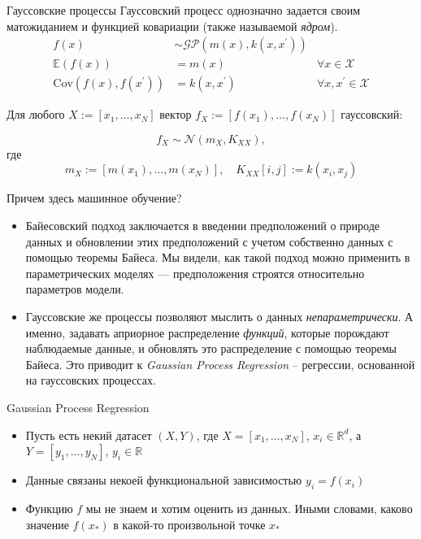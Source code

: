 \documentclass[fullscreen=true, bookmarks=true, hyperref={pdfencoding=unicode}]{beamer}
\begin{document}
\begin{frame}{Гауссовские процессы}
    Гауссовский процесс однозначно задается своим матожиданием и функцией ковариации (также называемой \textit{ядром}).
    \begin{align*} f(x) &\sim \mathcal{GP} (m(x), k(x, x^\prime)) \\
     \mathbb{E}(f(x)) &= m(x) \quad &\forall x \in \mathcal{X} \\
     \text{Cov} ( f(x), f(x^\prime) ) &= k(x, x^\prime) \quad &\forall x, x^\prime \in \mathcal{X} \end{align*}

    \pause
    Для любого $X := [x_1, \ldots, x_N]$ вектор $f_X := [f(x_1), \ldots, f(x_N)]$ гауссовский:

    $$ f_X \sim \mathcal{N}(m_X, K_{XX}), $$
    где
    $$m_X := [m(x_1), \ldots, m(x_N)], \quad K_{XX}[i, j] := k(x_i, x_j)$$
\end{frame}

\begin{frame}{Причем здесь машинное обучение?}
    \begin{itemize}
        \item<1-> Байесовский подход заключается в введении предположений о природе данных и обновлении этих предположений с учетом собственно данных с помощью теоремы Байеса. Мы видели, как такой подход можно применить в параметрических моделях --- предположения строятся относительно параметров модели.

        \item<2-> Гауссовские же процессы позволяют мыслить о данных \textit{непараметрически}. А именно, задавать априорное распределение \textit{функций}, которые порождают наблюдаемые данные, и обновлять это распределение с помощью теоремы Байеса. Это приводит к \textit{Gaussian Process Regression} -- регрессии, основанной на гауссовских процессах.
    \end{itemize}

\end{frame}

\begin{frame}{Gaussian Process Regression}
    \begin{itemize}
      \item Пусть есть некий датасет $(X, Y)$, где $X = [x_1, \ldots, x_N]$, $x_i \in \mathbb{R}^d$, а $Y = [y_1, \ldots, y_N]$, $ y_i \in \mathbb{R}$
      \pause
      \item Данные связаны некоей функциональной зависимостью $y_i = f(x_i)$
      \pause
      \item Функцию $f$ мы не знаем и хотим оценить из данных. Иными словами, каково значение $f(x_*)$ в какой-то произвольной точке $x_*$

    \end{itemize}

\end{frame}
\end{document}
